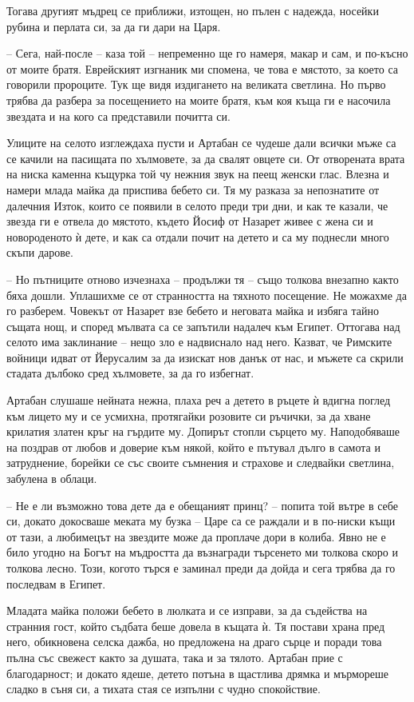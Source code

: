 Тогава другият мъдрец се приближи, изтощен, но пълен с надежда, носейки рубина и
перлата си, за да ги дари на Царя.

-- Сега, най-после -- каза той -- непременно ще го намеря, макар и сам, и
по-късно от моите братя. Еврейският изгнаник ми спомена, че това е мястото, за
което са говорили пророците. Тук ще видя издигането на великата светлина. Но
първо трябва да разбера за посещението на моите братя, към коя къща ги е
насочила звездата и на кого са представили почитта си.

Улиците на селото изглеждаха пусти и Артабан се чудеше дали всички мъже са се
качили на пасищата по хълмовете, за да свалят овцете си. От отворената врата на
ниска каменна къщурка той чу нежния звук на пеещ женски глас. Влезна и намери
млада майка да приспива бебето си. Тя му разказа за непознатите от далечния
Изток, които се появили в селото преди три дни, и как те казали, че звезда ги е
отвела до мястото, където Йосиф от Назарет живее с жена си и новороденото ѝ
дете, и как са отдали почит на детето и са му поднесли много скъпи дарове.

-- Но пътниците отново изчезнаха -- продължи тя -- също толкова внезапно както
бяха дошли. Уплашихме се от странността на тяхното посещение. Не можахме да го
разберем. Човекът от Назарет взе бебето и неговата майка и избяга тайно същата
нощ, и според мълвата са се запътили надалеч към Египет. Оттогава над селото има
заклинание -- нещо зло е надвиснало над него. Казват, че Римските войници идват
от Йерусалим за да изискат нов данък от нас, и мъжете са скрили стадата дълбоко
сред хълмовете, за да го избегнат.

Артабан слушаше нейната нежна, плаха реч а детето в ръцете ѝ вдигна поглед към
лицето му и се усмихна, протягайки розовите си ръчички, за да хване крилатия
златен кръг на гърдите му. Допирът стопли сърцето му. Наподобяваше на поздрав от
любов и доверие към някой, който е пътувал дълго в самота и затруднение, борейки
се със своите съмнения и страхове и следвайки светлина, забулена в облаци.

-- Не е ли възможно това дете да е обещаният принц? -- попита той вътре в себе
си, докато докосваше меката му бузка -- Царе са се раждали и в по-ниски къщи от
тази, а любимецът на звездите може да проплаче дори в колиба. Явно не е било
угодно на Богът на мъдростта да възнагради търсенето ми толкова скоро и толкова
лесно. Този, когото търся е заминал преди да дойда и сега трябва да го последвам
в Египет.

Младата майка положи бебето в люлката и се изправи, за да съдейства на странния
гост, който съдбата беше довела в къщата ѝ. Тя постави храна пред него,
обикновена селска дажба, но предложена на драго сърце и поради това пълна със
свежест както за душата, така и за тялото. Артабан прие с благодарност; и докато
ядеше, детето потъна в щастлива дрямка и мърмореше сладко в съня си, а тихата
стая се изпълни с чудно спокойствие.

